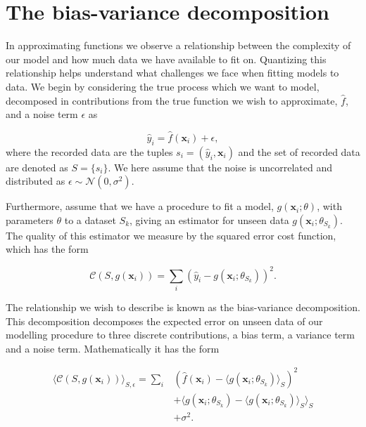 \chapter{The bias-variance decomposition}\label{appendix:bias_variance}

In approximating functions we observe a relationship between the complexity of our model and how much data we have available to fit on. Quantizing this relationship helps understand what challenges we face when fitting models to data. We begin by considering the true process which we want to model, decomposed in contributions from the true function we wish to approximate, $\hat{f}$, and a noise term $\epsilon$ as

\begin{equation}
\hat{y}_i = \hat{f}(\mathbf{x}_i) + \epsilon,
\end{equation}
\noindent where the recorded data are the tuples $s_i = (\hat{y}_i, \mathbf{x}_i)$ and the set of recorded data are denoted as $S = \{s_i\}$. We here assume that the noise is uncorrelated and distributed as $\epsilon \sim \mathcal{N}(0, \sigma^2)$.

Furthermore, assume that we have a procedure to fit a model, $g(\mathbf{x}_i; \theta)$, with parameters $\theta$ to a dataset $S_k$, giving an estimator for unseen data $g(\mathbf{x}_i; \theta _{S_k})$. The quality of this estimator we measure by the squared error cost function, which has the form

\begin{equation}
\mathcal{C}(S, g(\mathbf{x}_i)) = \sum_i (\hat{y}_i - g(\mathbf{x}_i; \theta_{S_k}))^2.
\end{equation}

\noindent The relationship we wish to describe is known as the bias-variance decomposition. This decomposition decomposes the expected error on unseen data of our modelling procedure to three discrete contributions, a bias term, a variance term and a noise term. Mathematically it has the form

\begin{equation}
\begin{split}
\langle \mathcal{C}(S, g(\mathbf{x}_i)) \rangle_{S, \epsilon} = \sum_i &(\hat{f}(\mathbf{x}_i) - \langle g(\mathbf{x}_i ; \theta_{S_k} )\rangle_S)^2 \\
& + \langle g(\mathbf{x}_i ; \theta_{S_k}) - \langle g(\mathbf{x}_i ; \theta_{S_k}) \rangle_S \rangle_S  \\
& + \sigma^2.
\end{split}
\end{equation}

